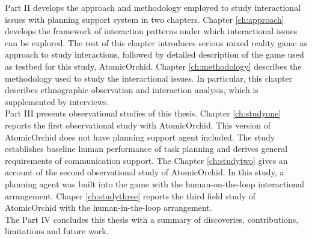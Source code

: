 Part II develops the approach and methodology employed to study interactional issues with planning support system in two chapters. Chapter \ref{ch:approach} develops the framework of interaction patterns under which interactional issues can be explored. The rest of this chapter introduces serious mixed reality game as approach to study interactions, followed by detailed description of the game used as testbed for this study, AtomicOrchid. Chapter \ref{ch:methodology} describes the methodology used to study the interactional issues. In particular, this chapter describes ethnographic observation and interaction analysis, which is supplemented by interviews. \\ 

Part III presents observational studies of this thesis. Chapter \ref{ch:studyone} reports the first observational study with AtomicOrchid. This version of AtomicOrchid does not have planning support agent included. The study establishes baseline human performance of task planning and derives general requirements of communication support. The Chapter \ref{ch:studytwo} gives an account of the second observational study of AtomicOrchid. In this study, a planning agent was built into the game with the human-on-the-loop interactional arrangement. Chaper \ref{ch:studythree} reports the third field study of AtomicOrchid with the human-in-the-loop arrangement. \\ 

The Part IV concludes this thesis with a summary of discoveries, contributions, limitations and future work.\\









